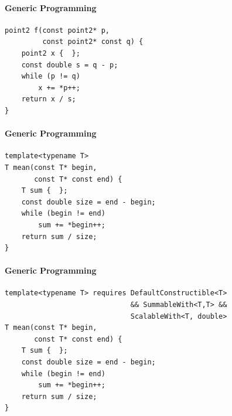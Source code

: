 \documentclass{beamer}
\begin{document}
    \begin{frame}[fragile]{}
        \framesubtitle{Generic Programming}
        \begin{center}
        \begin{lstlisting}[caption={another mysterious, yet strangely familiar function (déjà vu?).}]
point2 f(const point2* p,
         const point2* const q) {
    point2 x {  };
    const double s = q - p;
    while (p != q)
        x += *p++;
    return x / s;
} \end{lstlisting}
        \end{center}
    \end{frame}

    \begin{frame}[fragile]{}
        \framesubtitle{Generic Programming}
        \begin{center}
            \begin{lstlisting}[caption={natural generalization of the function from the previous slides.}]
template<typename T>
T mean(const T* begin,
       const T* const end) {
    T sum {  };
    const double size = end - begin;
    while (begin != end)
        sum += *begin++;
    return sum / size;
} \end{lstlisting}
        \end{center}
    \end{frame}

    \begin{frame}[fragile]{}
        \framesubtitle{Generic Programming}
        \begin{center}
        \begin{lstlisting}[caption={constraining the function template using a \texttt{requires} clause.}]
template<typename T> requires DefaultConstructible<T>
                              && SummableWith<T,T> &&
                              ScalableWith<T, double>
T mean(const T* begin,
       const T* const end) {
    T sum {  };
    const double size = end - begin;
    while (begin != end)
        sum += *begin++;
    return sum / size;
} \end{lstlisting}
        \end{center}
    \end{frame}
\end{document}
